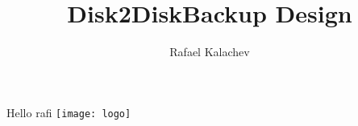 \documentclass[12pt]{article}
\title{Disk2DiskBackup Design}
\author{Rafael Kalachev}
\begin{document}
Hello rafi
\texttt{[image: logo]}
\end{document}
